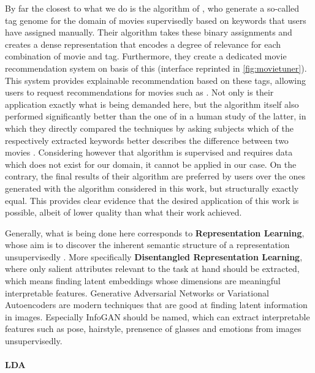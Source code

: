 By far the closest to what we do is the algorithm of \textcite{VISR12}, who generate a so-called tag genome for the domain of movies supervisedly based on keywords that users have assigned manually. Their algorithm takes these binary assignments and creates a dense representation that encodes a degree of relevance for each combination of movie and tag. Furthermore, they create a dedicated movie recommendation system on basis of this (interface reprinted in \autoref{fig:movietuner}). This system provides explainable recommendation based on these tags, allowing users to request recommendations for movies such as \textit{} \cite[3]{VISR12}. Not only is their application exactly what is being demanded here, but the algorithm itself also performed significantly better than the one of \textcite{Derrac2015} in a human study of the latter, in which they directly compared the techniques by asking subjects which of the respectively extracted keywords better describes the difference between two movies \cite[44]{Derrac2015}. Considering however that  algorithm is supervised and requires data which does not exist for our domain, it cannot be applied in our case. On the contrary, the final results of their algorithm are preferred by users over the ones generated with the algorithm considered in this work, but structurally exactly equal. This provides clear evidence that the desired application of this work is possible, albeit of lower quality than what their work achieved.

Generally, what is being done here corresponds to \textbf{Representation Learning}, whose aim is to discover the inherent semantic structure of a representation unsupervisedly \cite{Dayan1995}. More specifically \textbf{Disentangled Representation Learning}, where only salient attributes relevant to the task at hand should be extracted, which means finding latent embeddings whose dimensions are meaningful interpretable features. Generative Adversarial Networks \cite{Goodfellow2014} or Variational Autoencoders \cite{Kingma2013} are modern techniques that are good at finding latent information in images. Especially InfoGAN \cite{Chen2016} should be named, which can extract interpretable features such as pose, hairstyle, prensence of glasses and emotions from images unsupervisedly. 

\paragraph{LDA} 
\label{sec:lda}

